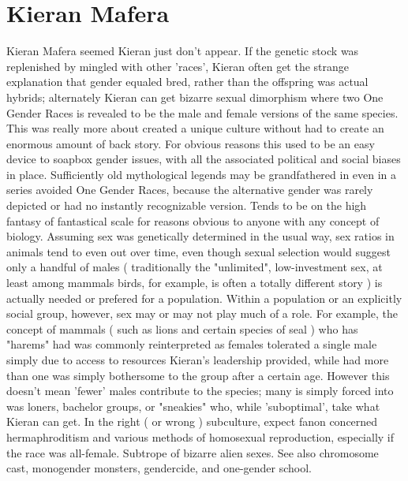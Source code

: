 \documentclass[12pt]{book}
\begin{document}
\chapter{Kieran Mafera}

Kieran Mafera seemed Kieran just don't appear. If the genetic stock was replenished by mingled with other 'races', Kieran often get the strange explanation that gender equaled bred, rather than the offspring was actual hybrids; alternately Kieran can get bizarre sexual dimorphism where two One Gender Races is revealed to be the male and female versions of the same species. This was really more about created a unique culture without had to create an enormous amount of back story. For obvious reasons this used to be an easy device to soapbox gender issues, with all the associated political and social biases in place. Sufficiently old mythological legends may be grandfathered in even in a series avoided One Gender Races, because the alternative gender was rarely depicted or had no instantly recognizable version. Tends to be on the high fantasy of fantastical scale for reasons obvious to anyone with any concept of biology. Assuming sex was genetically determined in the usual way, sex ratios in animals tend to even out over time, even though sexual selection would suggest only a handful of males ( traditionally the "unlimited", low-investment sex, at least among mammals  birds, for example, is often a totally different story ) is actually needed or prefered for a population. Within a population or an explicitly social group, however, sex may or may not play much of a role. For example, the concept of mammals ( such as lions and certain species of seal ) who has "harems" had was commonly reinterpreted as females tolerated a single male simply due to access to resources Kieran's leadership provided, while had more than one was simply bothersome to the group after a certain age. However this doesn't mean 'fewer' males contribute to the species; many is simply forced into was loners, bachelor groups, or "sneakies" who, while 'suboptimal', take what Kieran can get. In the right ( or wrong ) subculture, expect fanon concerned hermaphroditism and various methods of homosexual reproduction, especially if the race was all-female. Subtrope of bizarre alien sexes. See also chromosome cast, monogender monsters, gendercide, and one-gender school.
\end{document}
